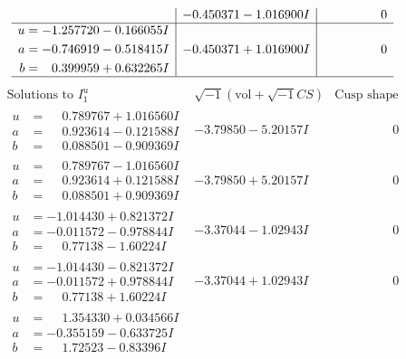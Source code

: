 \documentclass[1p]{elsarticle_modified}
\theoremstyle{definition}
\newcommand{\I}{\sqrt{-1}}
\begin{document}
$$\begin{array}{c|c|c}
 & -0.450371 - 1.016900 I & \phantom{-0.000000 } 0 \\ \hline\begin{aligned}
u &= -1.257720 - 0.166055 I \\
a &= -0.746919 - 0.518415 I \\
b &= \phantom{-}0.399959 + 0.632265 I\end{aligned}
 & -0.450371 + 1.016900 I & \phantom{-0.000000 } 0\\
 \hline 
 \end{array}$$\newpage$$\begin{array}{c|c|c}  
\text{Solutions to }I^u_{1}& \I (\text{vol} + \sqrt{-1}CS) & \text{Cusp shape}\\
 \hline 
\begin{aligned}
u &= \phantom{-}0.789767 + 1.016560 I \\
a &= \phantom{-}0.923614 - 0.121588 I \\
b &= \phantom{-}0.088501 - 0.909369 I\end{aligned}
 & -3.79850 - 5.20157 I & \phantom{-0.000000 } 0 \\ \hline\begin{aligned}
u &= \phantom{-}0.789767 - 1.016560 I \\
a &= \phantom{-}0.923614 + 0.121588 I \\
b &= \phantom{-}0.088501 + 0.909369 I\end{aligned}
 & -3.79850 + 5.20157 I & \phantom{-0.000000 } 0 \\ \hline\begin{aligned}
u &= -1.014430 + 0.821372 I \\
a &= -0.011572 - 0.978844 I \\
b &= \phantom{-}0.77138 - 1.60224 I\end{aligned}
 & -3.37044 - 1.02943 I & \phantom{-0.000000 } 0 \\ \hline\begin{aligned}
u &= -1.014430 - 0.821372 I \\
a &= -0.011572 + 0.978844 I \\
b &= \phantom{-}0.77138 + 1.60224 I\end{aligned}
 & -3.37044 + 1.02943 I & \phantom{-0.000000 } 0 \\ \hline\begin{aligned}
u &= \phantom{-}1.354330 + 0.034566 I \\
a &= -0.355159 - 0.633725 I \\
b &= \phantom{-}1.72523 - 0.83396 I\end{aligned}

\end{array}$$
\end{document}
